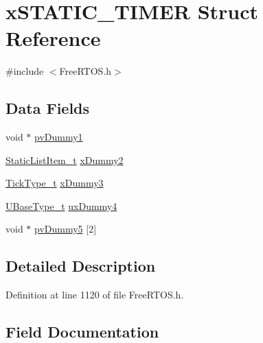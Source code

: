 \hypertarget{structx_s_t_a_t_i_c___t_i_m_e_r}{}\section{x\+S\+T\+A\+T\+I\+C\+\_\+\+T\+I\+M\+ER Struct Reference}
\label{structx_s_t_a_t_i_c___t_i_m_e_r}


{\ttfamily \#include $<$Free\+R\+T\+O\+S.\+h$>$}

\subsection*{Data Fields}
\begin{DoxyCompactItemize}
\item 
void $\ast$ \hyperlink{structx_s_t_a_t_i_c___t_i_m_e_r_a040499298faced6032f84f3a33c785fd}{pv\+Dummy1}
\item 
\hyperlink{_free_r_t_o_s_8h_a1d31bc0472385a87424518da484d9e09}{Static\+List\+Item\+\_\+t} \hyperlink{structx_s_t_a_t_i_c___t_i_m_e_r_a622e2e596e5829c9197bb44b9009474f}{x\+Dummy2}
\item 
\hyperlink{portmacro_8h_aa69c48c6e902ce54f70886e6573c92a9}{Tick\+Type\+\_\+t} \hyperlink{structx_s_t_a_t_i_c___t_i_m_e_r_a60d582d1d0b5b9b15e8050d5ae29bc30}{x\+Dummy3}
\item 
\hyperlink{portmacro_8h_a646f89d4298e4f5afd522202b11cb2e6}{U\+Base\+Type\+\_\+t} \hyperlink{structx_s_t_a_t_i_c___t_i_m_e_r_abe61bde25ac09934004caa0222f4831b}{ux\+Dummy4}
\item 
void $\ast$ \hyperlink{structx_s_t_a_t_i_c___t_i_m_e_r_a9410b4450349079b65e2c25605913cbf}{pv\+Dummy5} \mbox{[}2\mbox{]}
\end{DoxyCompactItemize}


\subsection{Detailed Description}


Definition at line 1120 of file Free\+R\+T\+O\+S.\+h.



\subsection{Field Documentation}
\mbox{\label{structx_s_t_a_t_i_c___t_i_m_e_r_a040499298faced6032f84f3a33c785fd}} 
